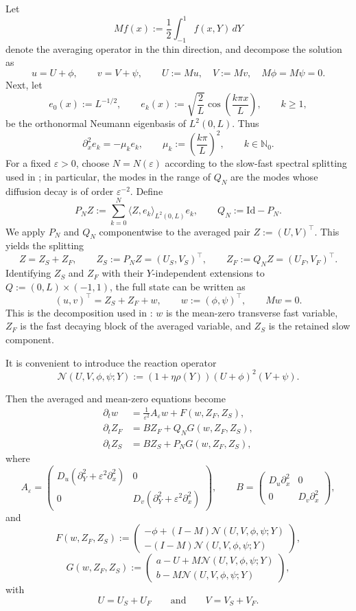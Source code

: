 \documentclass[11pt]{article}
\theoremstyle{definition}
\theoremstyle{remark}
\numberwithin{equation}{section}
\begin{document}
Let
\[
Mf(x):=\frac12\int_{-1}^1 f(x,Y)\,dY
\]
denote the averaging operator in the thin direction, and decompose the solution as
\[
u = U+\phi, \qquad v = V+\psi,
\qquad U:=Mu, \quad V:=Mv, \quad M\phi=M\psi=0.
\]
Next, let
\[
e_0(x):=L^{-1/2},\qquad
e_k(x):=\sqrt{\frac{2}{L}}\cos\!\left(\frac{k\pi x}{L}\right),
\qquad k\ge 1,
\]
be the orthonormal Neumann eigenbasis of \(L^2(0,L)\). Thus
\[
\partial_x^2 e_k=-\mu_k e_k,\qquad
\mu_k:=\left(\frac{k\pi}{L}\right)^2,
\qquad k\in\mathbb N_0.
\]
For a fixed \(\varepsilon>0\), choose \(N=N(\varepsilon)\) according to the
slow-fast spectral splitting used in ; in
particular, the modes in the range of \(Q_N\) are the modes whose diffusion
decay is of order \(\varepsilon^{-2}\). Define
\[
P_N Z := \sum_{k=0}^N \langle Z,e_k\rangle_{L^2(0,L)} e_k,
\qquad
Q_N:=\mathrm{Id}-P_N.
\]
We apply \(P_N\) and \(Q_N\) componentwise to the averaged pair
\(Z:=(U,V)^\top\).
This yields the splitting
\[
Z = Z_S + Z_F,
\qquad
Z_S := P_N Z = (U_S,V_S)^\top,
\qquad
Z_F := Q_N Z = (U_F,V_F)^\top.
\]
Identifying \(Z_S\) and \(Z_F\) with their \(Y\)-independent extensions to
\(Q:=(0,L)\times(-1,1)\), the full state can be written as
\[
(u,v)^\top = Z_S+Z_F+w,
\qquad
w:=(\phi,\psi)^\top,
\qquad Mw=0.
\]
This is the decomposition used in : \(w\) is
the mean-zero transverse fast variable, \(Z_F\) is the fast decaying block of
the averaged variable, and \(Z_S\) is the retained slow component.

It is convenient to introduce the reaction operator
\[
\mathcal{N}(U,V,\phi,\psi;Y) := (1 + \eta \rho(Y))(U+\phi)^2(V+\psi).
\]

Then the averaged and mean-zero equations become
\begin{equation}\label{eq:Schnakenberg split}
\begin{aligned}
\partial_t w &= \frac{1}{\varepsilon^2} A_\varepsilon w + F(w,Z_F,Z_S), \\
\partial_t Z_F &= B Z_F + Q_N G(w,Z_F,Z_S), \\
\partial_t Z_S &= B Z_S + P_N G(w,Z_F,Z_S),
\end{aligned}
\end{equation}
where
\[
A_\varepsilon =
\begin{pmatrix}
D_u(\partial_Y^2 + \varepsilon^2 \partial_x^2) & 0 \\
0 & D_v(\partial_Y^2 + \varepsilon^2 \partial_x^2)
\end{pmatrix},
\qquad
B =
\begin{pmatrix}
D_u \partial_x^2 & 0 \\
0 & D_v \partial_x^2
\end{pmatrix},
\]
and
\[
F(w,Z_F,Z_S) :=
\begin{pmatrix}
-\phi + (I-M)\mathcal{N}(U,V,\phi,\psi;Y) \\
-(I-M)\mathcal{N}(U,V,\phi,\psi;Y)
\end{pmatrix},
\]
\[
G(w,Z_F,Z_S) :=
\begin{pmatrix}
a - U + M\mathcal{N}(U,V,\phi,\psi;Y) \\
b - M\mathcal{N}(U,V,\phi,\psi;Y)
\end{pmatrix},
\]
with
\[
U = U_S + U_F
\qquad \text{and} \qquad
V = V_S + V_F.
\]
\end{document}

